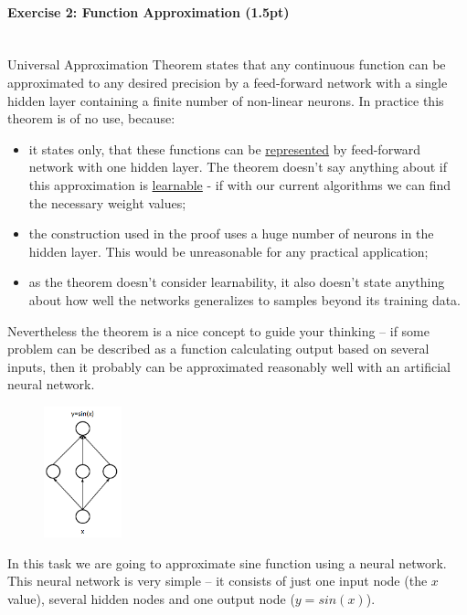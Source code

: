 \documentclass[a4paper,11pt]{article}
\newenvironment{exercise}[3]{\paragraph{Exercise #1: #2 (#3pt)}\ \\}{
\medskip}
\begin{document}
%
%
\begin{exercise}{2}{Function Approximation}{1.5}

Universal Approximation Theorem states that any continuous function can be approximated to any desired precision by a feed-forward network with a single hidden layer containing a finite number of non-linear neurons. In practice this theorem is of no use, because:
\begin{itemize}
  \item it states only, that these functions can be \uline{represented} by feed-forward network with one hidden layer. The theorem doesn’t say anything about if this approximation is \uline{learnable} - if with our current algorithms we can find the necessary weight values;
  \item the construction used in the proof uses a huge number of neurons in the hidden layer. This would be unreasonable for any practical application;
  \item as the theorem doesn’t consider learnability, it also doesn’t state anything about how well the networks generalizes to samples beyond its training data.
\end{itemize}

Nevertheless the theorem is a nice concept to guide your thinking – if some problem can be described as a function calculating output based on several inputs, then it probably can be approximated reasonably well with an artificial neural network.\newline

\begin{figure}
	\centering
	\vspace{-12pt}
	\includegraphics[width=0.20\textwidth]{sine.png}
	\label{fig:sineexample}
	\vspace{-5pt}
\end{figure}

In this task we are going to approximate sine function using a neural network. This neural network is very simple – it consists of just one input node (the $x$ value), several hidden nodes and one output node ($y = sin(x)$).


\end{exercise}
\end{document}
